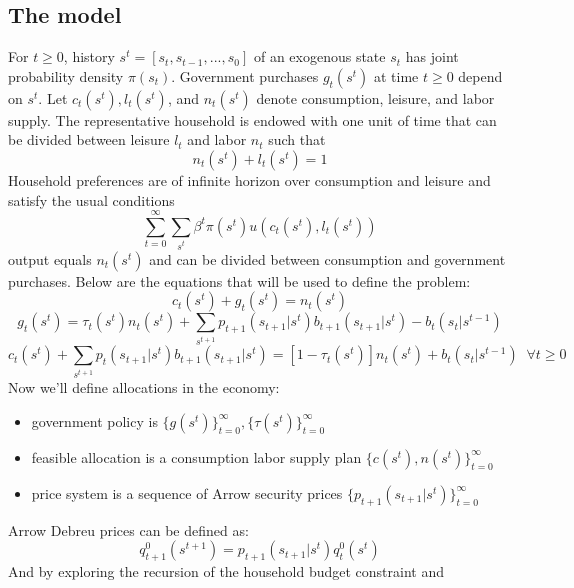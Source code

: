 \documentclass{article} %
\begin{document}
 \subsection{The model}
 For $t \geq 0$, history $s^t = [s_t,s_{t-1},...,s_0]$ of an exogenous
 state $s_t$ has joint probability density $\pi(s_t)$. Government
 purchases $g_t(s^t)$ at time $t \geq 0$ depend on $s^t$. Let
 $c_t(s^t),l_t(s^t)$, and $n_t(s^t)$ denote consumption, leisure, and
 labor supply. The representative household is endowed with one unit of time that can be divided between leisure $l_t$ and labor $n_t$ such that 
%
\begin{equation}
  n_t(s^t) + l_t(s^t) = 1 \label{eqn:time}
\end{equation}
%
Household preferences are of infinite horizon over consumption and
leisure and satisfy the usual conditions
%
\begin{equation}
\sum_{t=0}^{\infty} \sum_{s^t} \beta^t \pi(s^t) u(c_t(s^t),l_t(s^t)) \label{eqn:preferences}
\end{equation}
%
output equals $n_t(s^t)$ and can be divided between consumption and government purchases. Below are the equations that will be used to define the problem:
%
\begin{equation}
 c_t(s^t) + g_t(s^t) = n_t(s^t) \label{eqn:feasibility}
\end{equation}
%
\begin{equation}
g_t(s^t) = \tau_t(s^t)n_t(s^t) + \sum_{s^{t+1}} p_{t+1}(s_{t+1}|s^t) b_{t+1}(s_{t+1}|s^t) - b_{t}(s_{t}|s^{t-1}) \label{eqn:GB}
\end{equation}
%
\begin{equation}
c_t(s^t) + \sum_{s^{t+1}} p_t(s_{t+1}|s^t) b_{t+1}(s_{t+1}|s^t)  = [1 -\tau_t(s^t)]n_t(s^t) + b_{t}(s_{t}|s^{t-1}) \;\; \forall t\geq 0 \label{eqn:HB}
\end{equation}
%
Now we'll define allocations in the economy:
%
\begin{itemize}
\item government policy is $\{g(s^t) \}_{t=0}^{\infty}, \{\tau(s^t) \}_{t=0}^{\infty}$
\item feasible allocation is a consumption labor supply plan $\{c(s^t),n(s^t) \}_{t=0}^{\infty}$
\item price system is a sequence of Arrow security prices $\{p_{t+1}(s_{t+1}|s^t)\}_{t=0}^{\infty}$
\end{itemize}
%
Arrow Debreu prices can be defined as:
%
$$q_{t+1}^0(s^{t+1}) = p_{t+1}(s_{t+1}|s^t) q_{t}^0(s^{t})$$
%
And by exploring the recursion of the household budget constraint and
\end{document}
